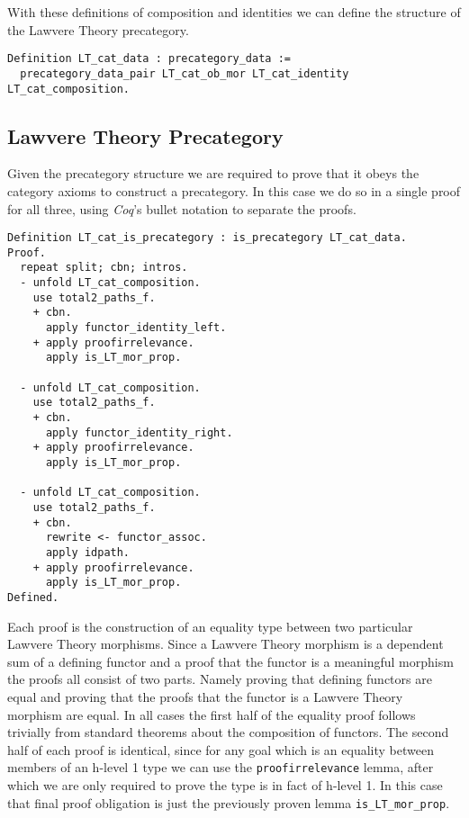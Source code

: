 With these definitions of composition and identities we can define the structure
of the Lawvere Theory precategory.
\begin{lstlisting}
Definition LT_cat_data : precategory_data := 
  precategory_data_pair LT_cat_ob_mor LT_cat_identity LT_cat_composition.
\end{lstlisting}

\subsection{Lawvere Theory Precategory}
Given the precategory structure we are required to prove that it obeys the
category axioms to construct a precategory. In this case we do so in a single
proof for all three, using \textit{Coq}'s bullet notation to separate the
proofs.
\begin{lstlisting}
Definition LT_cat_is_precategory : is_precategory LT_cat_data.
Proof.
  repeat split; cbn; intros.
  - unfold LT_cat_composition.
    use total2_paths_f.
    + cbn.
      apply functor_identity_left.
    + apply proofirrelevance.
      apply is_LT_mor_prop.

  - unfold LT_cat_composition.
    use total2_paths_f.
    + cbn.
      apply functor_identity_right.
    + apply proofirrelevance.
      apply is_LT_mor_prop.

  - unfold LT_cat_composition.
    use total2_paths_f.
    + cbn.
      rewrite <- functor_assoc.
      apply idpath.
    + apply proofirrelevance.
      apply is_LT_mor_prop.
Defined.
\end{lstlisting}

Each proof is the construction of an equality type between two particular
Lawvere Theory morphisms. Since a Lawvere Theory morphism is a dependent sum of
a defining functor and a proof that the functor is a meaningful morphism the
proofs all consist of two parts. Namely proving that defining functors are equal
and proving that the proofs that the functor is a Lawvere Theory morphism are
equal. In all cases the first half of the equality proof follows trivially from
standard theorems about the composition of functors. The second half of each
proof is identical, since for any goal which is an equality between members of
an h-level 1 type we can use the \lstinline|proofirrelevance| lemma, after which we
are only required to prove the type is in fact of h-level 1. In this case that
final proof obligation is just the previously proven lemma
\lstinline|is_LT_mor_prop|.

